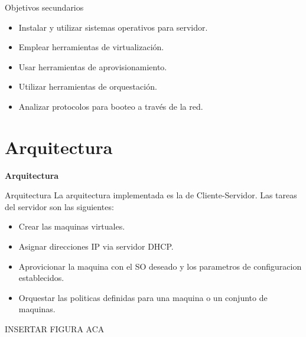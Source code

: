 \documentclass{beamer}
\begin{document}
\begin{frame}{Objetivos secundarios}
\vspace{-1.5cm}
\begin{itemize}
    \item Instalar y utilizar sistemas operativos para servidor.
    \item Emplear herramientas de virtualización.
    \item Usar herramientas de aprovisionamiento.
    \item Utilizar herramientas de orquestación.
    \item Analizar protocolos para booteo a través de la red.
\end{itemize}

\end{frame}


\section{Arquitectura}

\begin{frame}
    \Huge
    \centering
    \textbf{ Arquitectura }

\end{frame}

\begin{frame}{Arquitectura}
\vspace{-1.5cm}
La arquitectura implementada es la de Cliente-Servidor.
Las tareas del servidor son las siguientes:
\begin{itemize}
    \item Crear las maquinas virtuales.
    \item Asignar direcciones IP via servidor DHCP.
    \item Aprovicionar la maquina con el SO deseado y los parametros de configuracion establecidos.
    \item Orquestar las politicas definidas para una maquina o un conjunto de maquinas.
\end{itemize}
 INSERTAR FIGURA ACA

\end{frame}
\end{document}
